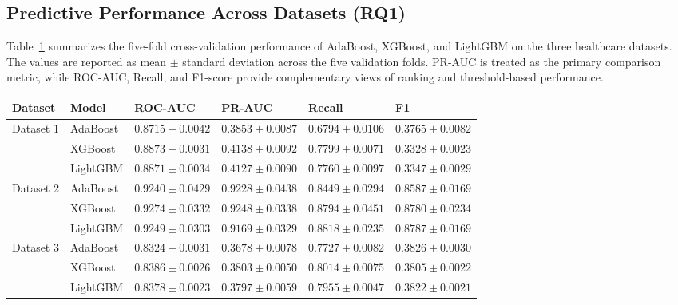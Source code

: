 \subsection{Predictive Performance Across Datasets (RQ1)}

Table~\ref{tab:cv_model_results} summarizes the five-fold cross-validation
performance of AdaBoost, XGBoost, and LightGBM on the three healthcare
datasets. The values are reported as mean $\pm$ standard deviation across the
five validation folds. PR-AUC is treated as the primary comparison metric,
while ROC-AUC, Recall, and F1-score provide complementary views of ranking and
threshold-based performance.

\begin{table}[H]
\centering
\begin{minipage}{0.90\linewidth}
\centering
    \begin{captionbelowboxaivn}
        \label{tab:cv_model_results}
    \end{captionbelowboxaivn}

    \renewcommand{\arraystretch}{1.1}
    \small

    \begin{tabularx}{\linewidth}{@{}
        >{\raggedright\arraybackslash}X
        >{\raggedright\arraybackslash}X
        >{\centering\arraybackslash}X
        >{\centering\arraybackslash}X
        >{\centering\arraybackslash}X
        >{\centering\arraybackslash}X@{}}
	\textbf{Dataset} & \textbf{Model} & \textbf{ROC-AUC} & \textbf{PR-AUC} & \textbf{Recall} & \textbf{F1} \\
\hline
Dataset 1 & AdaBoost & $0.8715 \pm 0.0042$ & $0.3853 \pm 0.0087$ & $0.6794 \pm 0.0106$ & $0.3765 \pm 0.0082$ \\
 & XGBoost & $0.8873 \pm 0.0031$ & $0.4138 \pm 0.0092$ & $0.7799 \pm 0.0071$ & $0.3328 \pm 0.0023$ \\
 & LightGBM & $0.8871 \pm 0.0034$ & $0.4127 \pm 0.0090$ & $0.7760 \pm 0.0097$ & $0.3347 \pm 0.0029$ \\
\hline
Dataset 2 & AdaBoost & $0.9240 \pm 0.0429$ & $0.9228 \pm 0.0438$ & $0.8449 \pm 0.0294$ & $0.8587 \pm 0.0169$ \\
 & XGBoost & $0.9274 \pm 0.0332$ & $0.9248 \pm 0.0338$ & $0.8794 \pm 0.0451$ & $0.8780 \pm 0.0234$ \\
 & LightGBM & $0.9249 \pm 0.0303$ & $0.9169 \pm 0.0329$ & $0.8818 \pm 0.0235$ & $0.8787 \pm 0.0169$ \\
\hline
Dataset 3 & AdaBoost & $0.8324 \pm 0.0031$ & $0.3678 \pm 0.0078$ & $0.7727 \pm 0.0082$ & $0.3826 \pm 0.0030$ \\
 & XGBoost & $0.8386 \pm 0.0026$ & $0.3803 \pm 0.0050$ & $0.8014 \pm 0.0075$ & $0.3805 \pm 0.0022$ \\
 & LightGBM & $0.8378 \pm 0.0023$ & $0.3797 \pm 0.0059$ & $0.7955 \pm 0.0047$ & $0.3822 \pm 0.0021$ \\
        \end{tabularx}
\end{minipage}
\end{table}

